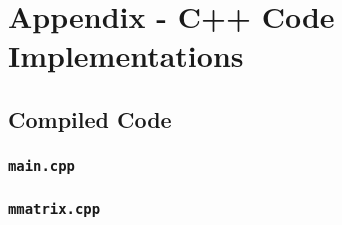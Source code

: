 \documentclass{article}
\begin{document}
\printbibliography

\appendix

\section{Appendix - C++ Code Implementations}

\subsection{Compiled Code}

\subsubsection{\texttt{main.cpp}}


\subsubsection{\texttt{mmatrix.cpp}}
\end{document}
